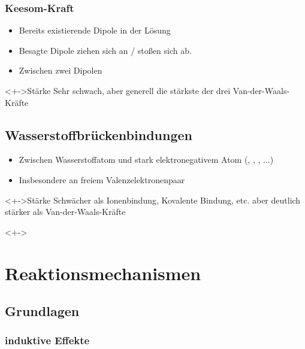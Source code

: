 \subsection{Keesom-Kraft}

\begin{itemize}
	\item<+-> Bereits existierende Dipole in der Lösung
	\item<+-> Besagte Dipole ziehen sich an / stoßen sich ab.
	\item<+-> Zwischen zwei Dipolen
\end{itemize}
\begin{block}<+->{Stärke}
	Sehr schwach, aber generell die stärkste der drei Van-der-Waals-Kräfte
\end{block}


\section{Wasserstoffbrückenbindungen}

\begin{itemize}
	\item<+-> Zwischen Wasserstoffatom und stark elektronegativem Atom (, , , ...)
	\item<+-> Insbesondere an freiem Valenzelektronenpaar
\end{itemize}
\begin{block}<+->{Stärke}
	Schwächer als Ionenbindung, Kovalente Bindung, etc. aber deutlich stärker als Van-der-Waals-Kräfte
\end{block}
\begin{examples}<+->
\end{examples}


\chapter{Reaktionsmechanismen}
\section{Grundlagen}
\subsection{induktive Effekte}

